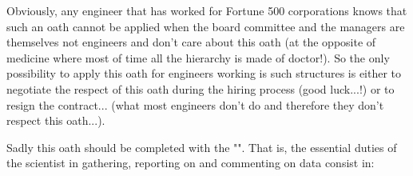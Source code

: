 	\begin{tcolorbox}[title=Remark,colframe=black,arc=10pt]
	Obviously, any engineer that has worked for Fortune 500 corporations knows that such an oath cannot be applied when the board committee and the managers are themselves not engineers and don't care about this oath (at the opposite of medicine where most of time all the hierarchy is made of doctor!). So the only possibility to apply this oath for engineers working is such structures is either to negotiate the respect of this oath during the hiring process (good luck...!) or to resign the contract... (what most engineers don't do and therefore they don't respect this oath...).
	\end{tcolorbox}
Sadly this oath should be completed with the "". That is, the essential duties of the scientist in gathering, reporting on and commenting on data consist in:

